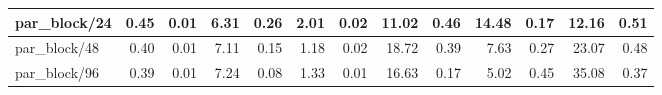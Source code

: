 \begin{tabular}{|lllllllllllll|}
\multicolumn{1}{|l|}{par\_block/24}  & \multicolumn{1}{r|}{0.45} & \multicolumn{1}{r|}{0.01} & \multicolumn{1}{r|}{6.31} & \multicolumn{1}{r|}{0.26}  & \multicolumn{1}{r|}{2.01} & \multicolumn{1}{r|}{0.02} & \multicolumn{1}{r|}{11.02} & \multicolumn{1}{r|}{0.46}  & \multicolumn{1}{r|}{14.48} & \multicolumn{1}{r|}{0.17} & \multicolumn{1}{r|}{12.16} & \multicolumn{1}{r|}{0.51}  \\ \hline
\multicolumn{1}{|l|}{par\_block/48}  & \multicolumn{1}{r|}{0.40} & \multicolumn{1}{r|}{0.01} & \multicolumn{1}{r|}{7.11} & \multicolumn{1}{r|}{0.15}  & \multicolumn{1}{r|}{1.18} & \multicolumn{1}{r|}{0.02} & \multicolumn{1}{r|}{18.72} & \multicolumn{1}{r|}{0.39}  & \multicolumn{1}{r|}{7.63} & \multicolumn{1}{r|}{0.27} & \multicolumn{1}{r|}{23.07} & \multicolumn{1}{r|}{0.48}  \\ \hline
\multicolumn{1}{|l|}{par\_block/96}  & \multicolumn{1}{r|}{0.39} & \multicolumn{1}{r|}{0.01} & \multicolumn{1}{r|}{7.24} & \multicolumn{1}{r|}{0.08}  & \multicolumn{1}{r|}{1.33} & \multicolumn{1}{r|}{0.01} & \multicolumn{1}{r|}{16.63} & \multicolumn{1}{r|}{0.17}  & \multicolumn{1}{r|}{5.02} & \multicolumn{1}{r|}{0.45} & \multicolumn{1}{r|}{35.08} & \multicolumn{1}{r|}{0.37}  \\ \hline
\end{tabular}
